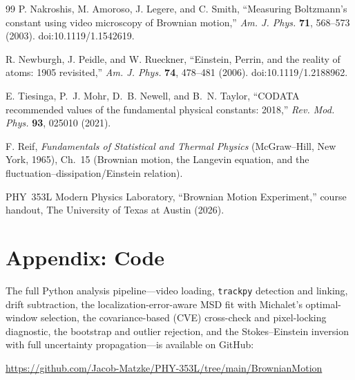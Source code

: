 \documentclass[11pt]{article}
\begin{document}
\begin{thebibliography}{99}
 P. Nakroshis, M. Amoroso, J. Legere, and C. Smith, ``Measuring
Boltzmann's constant using video microscopy of Brownian motion,'' \textit{Am. J.
Phys.} \textbf{71}, 568--573 (2003). doi:10.1119/1.1542619.

 R. Newburgh, J. Peidle, and W. Rueckner, ``Einstein, Perrin, and
the reality of atoms: 1905 revisited,'' \textit{Am. J. Phys.} \textbf{74}, 478--481
(2006). doi:10.1119/1.2188962.

 E. Tiesinga, P.~J. Mohr, D.~B. Newell, and B.~N. Taylor, ``CODATA
recommended values of the fundamental physical constants: 2018,'' \textit{Rev. Mod.
Phys.} \textbf{93}, 025010 (2021).

 F. Reif, \textit{Fundamentals of Statistical and Thermal Physics}
(McGraw--Hill, New York, 1965), Ch.~15 (Brownian motion, the Langevin equation, and
the fluctuation--dissipation/Einstein relation).

 PHY~353L Modern Physics Laboratory, ``Brownian Motion
Experiment,'' course handout, The University of Texas at Austin (2026).

\end{thebibliography}

\clearpage
\onecolumn
\appendix

\section{Appendix: Code}
The full Python analysis pipeline---video loading, \texttt{trackpy} detection and
linking, drift subtraction, the localization-error-aware MSD fit with Michalet's
optimal-window selection, the covariance-based (CVE) cross-check and pixel-locking
diagnostic, the bootstrap and outlier rejection, and the Stokes--Einstein inversion
with full uncertainty propagation---is available on GitHub:

\begin{center}
\url{https://github.com/Jacob-Matzke/PHY-353L/tree/main/BrownianMotion}
\end{center}
\end{document}
